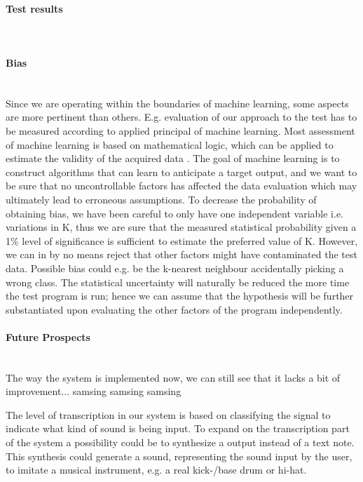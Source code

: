 \paragraph{Test results} \hspace{0pt} \\


\paragraph{Bias} \hspace{0pt} \\
Since we are operating within the boundaries of machine learning, some aspects are more pertinent than others. E.g. evaluation of our approach to the test has to be measured according to applied principal of machine learning. Most assessment of machine learning is based on mathematical logic, which can be applied to estimate the validity of the acquired data \citep{Gordon1995}. The goal of machine learning is to construct algorithms that can learn to anticipate a target output, and we want to be sure that no uncontrollable factors has affected the data evaluation which may ultimately lead to erroneous assumptions\citep{Gordon1995}. To decrease the probability of obtaining bias, we have been careful to only have one independent variable i.e. variations in K, thus we are sure that the measured statistical probability given a 1\% level of significance is sufficient to estimate the preferred value of K. However, we can in by no means reject that other factors might have contaminated the test data. Possible bias could e.g. be the k-nearest neighbour accidentally picking a wrong class. The statistical uncertainty will naturally be reduced the more time the test program is run; hence we can assume that the hypothesis will be further substantiated upon evaluating the other factors of the program independently.\\
\paragraph{Future Prospects} \hspace{0pt} \\
The way the system is implemented now, we can still see that it lacks a bit of improvement... samsing samsing samsing

The level of transcription in our system is based on classifying the signal to indicate what kind of sound is being input. To expand on the transcription part of the system a possibility could be to synthesize a output instead of a text note. This synthesis could generate a sound, representing the sound input by the user, to imitate a musical instrument, e.g. a real kick-/base drum or hi-hat.

